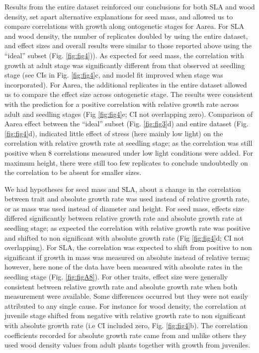 \documentclass[a4paper,11pt]{article}
\begin{document}
Results from the entire dataset reinforced our conclusions for both SLA and wood density, set apart alternative explanations for seed mass, and allowed us to compare correlations with growth along ontogenetic stages for Aarea. For SLA and wood density, the number of replicates doubled by using the entire dataset, and effect sizes and overall results were similar to those reported above using the ``ideal'' subset (Fig. \ref{fig:fig4})). As expected for seed mass, the correlation with growth at adult stage was significantly different from that observed at seedling stage (see CIs in Fig. \ref{fig:fig4}c, and model fit improved when stage was incorporated). For Aarea, the additional replicates in the entire dataset allowed us to compare the effect size across ontogenetic stage. The results were consistent with the prediction for a positive correlation with relative growth rate across adult and seedling stages (Fig \ref{fig:fig4}e; CI not overlapping zero). Comparison of Aarea effect between the ``ideal'' subset (Fig. \ref{fig:fig3}d) and entire dataset (Fig. \ref{fig:fig4}d), indicated little effect of stress (here mainly low light) on the correlation with relative growth rate at seedling stage; as the correlation was still positive when 8 correlations measured under low light conditions were added. For maximum height, there were still too few replicates to conclude undoubtedly on the correlation to be absent for smaller sizes.

We had hypotheses for seed mass and SLA, about a change in the correlation between trait and absolute growth rate was used instead of relative growth rate, or as mass was used instead of diameter and height. For seed mass, effects size differed significantly between relative growth rate and absolute growth rate at seedling stage; as expected the correlation with relative growth rate was positive and shifted to non significant with absolute growth rate (Fig \ref{fig:fig4}d; CI not overlapping). For SLA, the correlation was expected to shift from positive to non significant if growth in mass was measured on absolute instead of relative terms; however, here none of the data have been measured with absolute rates in the seedling stage (Fig. \ref{fig:figA8}).
For other traits, effect size were generally consistent between relative growth rate and absolute growth rate when both measurement were available. Some differences occurred but they were not easily attributed to any single cause. For instance for wood density, the correlation at juvenile stage shifted from negative with relative growth rate to non significant with absolute growth rate (i.e CI included zero, Fig. \ref{fig:fig4}b). The correlation coefficients recorded for absolute growth rate came from \citet{Augspurger:1984ct} and unlike others they used wood density values from adult plants together with growth from juveniles.
\end{document}
